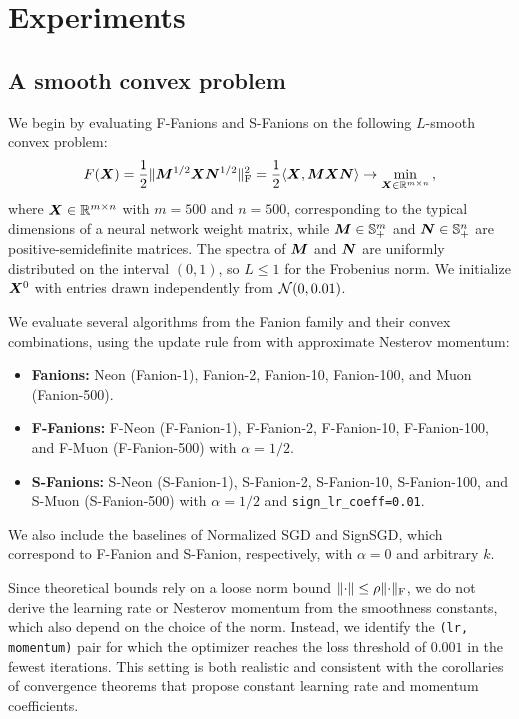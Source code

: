 \documentclass[pmlr]{jmlr}%
\newcommand{\norm}[1]{\lVert #1\rVert}
\DeclarePairedDelimiter{\normf}{\|}{\|_\mathrm{F}}
\def\<#1,#2>{\langle #1,#2\rangle}
\newcommand{\Rmn}{\R^{m\times n}}
\begin{document}
 \section{Experiments}\label{sec:experiments}
 
 \subsection{A smooth convex problem}
 \label{subsec:lls_exps}
 
 We begin by evaluating F-Fanions and S-Fanions on the following $L$-smooth convex problem:
 \begin{equation}\label{eq:lls}
   F(\mX) = \frac{1}{2}\normf{\mM^{1/2}\mX\mN^{1/2}}^2 = \frac{1}{2} \<\mX, \mM \mX \mN> \to \min_{\mX \in \Rmn}\,,
 \end{equation}
 where $\mX \in \Rmn$ with $m=500$ and $n=500$, corresponding to the typical dimensions of a neural network weight matrix, while ${\bm{M}} \in \mathbb{S}^m_{+}$ and ${\bm{N}} \in \mathbb{S}^n_{+}$ are positive-semidefinite matrices. The spectra of ${\bm{M}}$ and ${\bm{N}}$ are uniformly distributed on the interval $(0, 1)$, so $L \le 1$ for the Frobenius norm. We initialize ${\bm{X}}^0$ with entries drawn independently from $\mathcal{N}(0, 0.01)$.
 
 We evaluate several algorithms from the Fanion family and their convex combinations, using the update rule from  with approximate Nesterov momentum:
 \begin{itemize}
   \item \textbf{Fanions:} Neon (Fanion-1), Fanion-2, Fanion-10, Fanion-100, and Muon (Fanion-500).
   \item \textbf{F-Fanions:} F-Neon (F-Fanion-1), F-Fanion-2, F-Fanion-10, F-Fanion-100, and F-Muon (F-Fanion-500) with $\alpha=1/2$.
   \item \textbf{S-Fanions:} S-Neon (S-Fanion-1), S-Fanion-2, S-Fanion-10, S-Fanion-100, and S-Muon (S-Fanion-500) with $\alpha=1/2$ and \texttt{sign\_lr\_coeff=0.01}.
 \end{itemize}
 We also include the baselines of Normalized SGD and SignSGD, which correspond to F-Fanion and S-Fanion, respectively, with $\alpha = 0$ and arbitrary $k$.
 
 Since theoretical bounds \citep{kovalev2025understanding, riabinin2025gluon} rely on a loose norm bound $\norm{\cdot}\le \rho \normf{\cdot}$, we do not derive the learning rate or Nesterov momentum from the smoothness constants, which also depend on the choice of the norm. Instead, we identify the \texttt{(lr, momentum)} pair for which the optimizer reaches the loss threshold of $0.001$ in the fewest iterations. This setting is both realistic and consistent with the corollaries of convergence theorems that propose constant learning rate and momentum coefficients.
 
\end{document}
